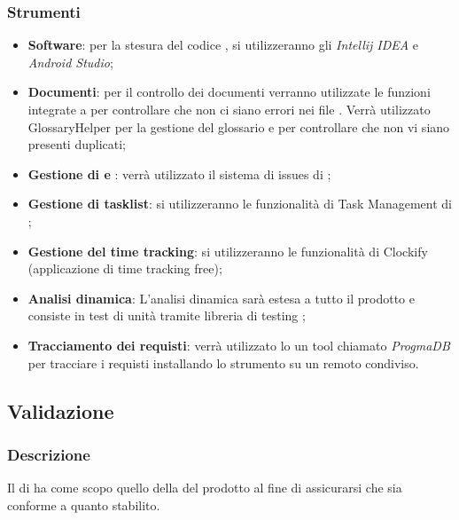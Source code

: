 \subsubsection{Strumenti}
\begin{itemize}
	\item \textbf{Software}:  per la stesura del codice , si utilizzeranno gli  \emph{Intellij IDEA} e \emph{Android Studio};
	\item \textbf{Documenti}: per il controllo dei documenti verranno utilizzate le funzioni integrate a  per controllare che non ci siano errori nei file . Verrà utilizzato GlossaryHelper per la gestione del glossario e per controllare che non vi siano presenti duplicati;
	\item \textbf{Gestione di  e }: verrà utilizzato il sistema di issues di ;
	\item \textbf{Gestione di tasklist}: si utilizzeranno le funzionalità di Task Management di ;
	\item \textbf{Gestione del time tracking}: si utilizzeranno le funzionalità di Clockify (applicazione di time tracking free);
	\item \textbf{Analisi dinamica}: L'analisi dinamica sarà estesa a tutto il  prodotto e consiste in test di unità tramite libreria di testing ;
	\item \textbf{Tracciamento dei requisti}: verrà utilizzato lo un tool chiamato \emph{ProgmaDB} per tracciare i requisti installando lo strumento su un  remoto condiviso.
\end{itemize}
\subsection{Validazione}
\subsubsection{Descrizione}
Il  di  ha come scopo quello della  del prodotto al fine di assicurarsi che sia conforme a quanto stabilito.

